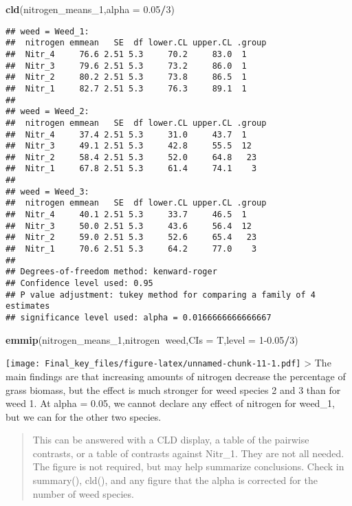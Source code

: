 \documentclass[
]{article}
\newenvironment{Shaded}{\begin{snugshade}}{\end{snugshade}}
\newcommand{\DataTypeTok}[1]{\textcolor[rgb]{0.13,0.29,0.53}{#1}}
\newcommand{\DecValTok}[1]{\textcolor[rgb]{0.00,0.00,0.81}{#1}}
\newcommand{\FloatTok}[1]{\textcolor[rgb]{0.00,0.00,0.81}{#1}}
\newcommand{\KeywordTok}[1]{\textcolor[rgb]{0.13,0.29,0.53}{\textbf{#1}}}
\newcommand{\NormalTok}[1]{#1}
\newcommand{\OperatorTok}[1]{\textcolor[rgb]{0.81,0.36,0.00}{\textbf{#1}}}
\begin{document}
\begin{Shaded}
\begin{Highlighting}[]
\KeywordTok{cld}\NormalTok{(nitrogen_means_}\DecValTok{1}\NormalTok{,}\DataTypeTok{alpha =} \FloatTok{0.05}\OperatorTok{/}\DecValTok{3}\NormalTok{)}
\end{Highlighting}
\end{Shaded}

\begin{verbatim}
## weed = Weed_1:
##  nitrogen emmean   SE  df lower.CL upper.CL .group
##  Nitr_4     76.6 2.51 5.3     70.2     83.0  1    
##  Nitr_3     79.6 2.51 5.3     73.2     86.0  1    
##  Nitr_2     80.2 2.51 5.3     73.8     86.5  1    
##  Nitr_1     82.7 2.51 5.3     76.3     89.1  1    
## 
## weed = Weed_2:
##  nitrogen emmean   SE  df lower.CL upper.CL .group
##  Nitr_4     37.4 2.51 5.3     31.0     43.7  1    
##  Nitr_3     49.1 2.51 5.3     42.8     55.5  12   
##  Nitr_2     58.4 2.51 5.3     52.0     64.8   23  
##  Nitr_1     67.8 2.51 5.3     61.4     74.1    3  
## 
## weed = Weed_3:
##  nitrogen emmean   SE  df lower.CL upper.CL .group
##  Nitr_4     40.1 2.51 5.3     33.7     46.5  1    
##  Nitr_3     50.0 2.51 5.3     43.6     56.4  12   
##  Nitr_2     59.0 2.51 5.3     52.6     65.4   23  
##  Nitr_1     70.6 2.51 5.3     64.2     77.0    3  
## 
## Degrees-of-freedom method: kenward-roger 
## Confidence level used: 0.95 
## P value adjustment: tukey method for comparing a family of 4 estimates 
## significance level used: alpha = 0.0166666666666667
\end{verbatim}

\begin{Shaded}
\begin{Highlighting}[]
\KeywordTok{emmip}\NormalTok{(nitrogen_means_}\DecValTok{1}\NormalTok{,nitrogen}\OperatorTok{~}\NormalTok{weed,}\DataTypeTok{CIs =}\NormalTok{ T,}\DataTypeTok{level =} \DecValTok{1}\FloatTok{-0.05}\OperatorTok{/}\DecValTok{3}\NormalTok{)}
\end{Highlighting}
\end{Shaded}

\texttt{[image: Final\_key\_files/figure-latex/unnamed-chunk-11-1.pdf]}
\textgreater{} The main findings are that increasing amounts of nitrogen
decrease the percentage of grass biomass, but the effect is much
stronger for weed species 2 and 3 than for weed 1. At alpha = 0.05, we
cannot declare any effect of nitrogen for weed\_1, but we can for the
other two species.

\begin{quote}
This can be answered with a CLD display, a table of the pairwise
contrasts, or a table of contrasts against Nitr\_1. They are not all
needed. The figure is not required, but may help summarize conclusions.
Check in summary(), cld(), and any figure that the alpha is corrected
for the number of weed species.
\end{quote}
\end{document}
